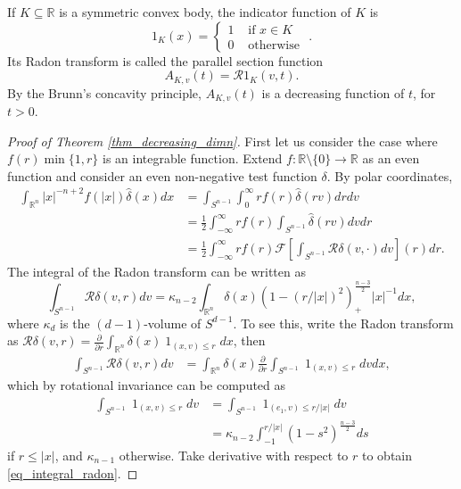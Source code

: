 \documentclass{amsart}
\def \R {\mathbb R}
\renewcommand {\chi}{\operatorname{1}}
\begin{document}
If $K \subseteq \R$ is a symmetric convex body, the indicator function of $K$ is
\[1_K(x) = \begin{cases} 1 & \text{ if } x \in K \\ 0 & \text{ otherwise } \end{cases}.\]
	Its Radon transform is called the parallel section function
\[A_{K,v}(t) = \mathcal R 1_K(v,t).\]
By the Brunn's concavity principle, $A_{K,v}(t)$ is a decreasing function of $t$, for $t>0$.

\begin{proof}[Proof of Theorem \ref{thm_decreasing_dimn}]
	First let us consider the case where $f(r) \min\{1, r\}$ is an integrable function.
	Extend $f:\R \setminus\{0\} \to \R$ as an even function and consider an even non-negative test function $\delta$. By polar coordinates,
\begin{align}
	\int_{\R^n} |x|^{-n+2} f(|x|) \hat \delta(x) d x
	&= \int_{S^{n-1}} \int_0^\infty r f(r) \hat \delta(r v) d r d v \\
	&= \frac 12 \int_{-\infty}^\infty r f(r) \int_{S^{n-1}} \hat \delta(r v) d v d r \\
	&= \frac 12 \int_{-\infty}^\infty r f(r) \mathcal F\left[ \int_{S^{n-1}}\mathcal R \delta (v,\cdot) dv \right](r) d r.
\end{align}
The integral of the Radon transform can be written as
	\begin{equation}
		\label{eq_integral_radon}
		\int_{S^{n-1}}\mathcal R \delta (v,r) dv = \kappa_{n-2} \int_{\R^n} \delta(x) ( 1 - (r/|x|)^2 )_+^{\frac{n-3}2} |x|^{-1} dx,
	\end{equation}
	where $\kappa_d$ is the $(d-1)$-volume of $S^{d-1}$.
	To see this, write the Radon transform as $\mathcal R \delta (v,r) = \frac{\partial}{\partial r} \int_{\R^n} \delta(x) \chi_{(x, v) \leq r} dx$, then
\begin{align}
	\int_{S^{n-1}}\mathcal R \delta (v,r) d v
	&= \int_{\R^n} \delta(x) \frac{\partial}{\partial r} \int_{S^{n-1}} \chi_{(x, v) \leq r} d v d x,
\end{align}
which by rotational invariance can be computed as
\begin{align}
	\int_{S^{n-1}} \chi_{(x, v) \leq r} d v
		&= \int_{S^{n-1}} \chi_{ (e_1, v) \leq r/|x|} d v \\
		&= \kappa_{n-2} \int_{-1}^{r/|x|} (1-s^2)^{\frac{n-3}2} d s
\end{align}
if $r \leq |x|$, and $\kappa_{n-1}$ otherwise.
Take derivative with respect to $r$ to obtain \eqref{eq_integral_radon}.


\end{proof}
\end{document}
